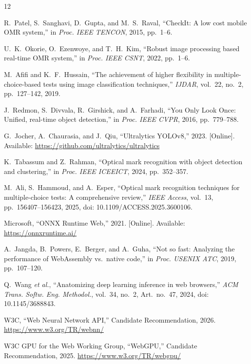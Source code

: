 \documentclass[conference]{IEEEtran}
\begin{document}
\begin{thebibliography}{12}
\setlength{\itemsep}{0pt}\setlength{\parsep}{0pt}\scriptsize

R.~Patel, S.~Sanghavi, D.~Gupta, and M.~S.~Raval,
``CheckIt: A low cost mobile OMR system,''
in \textit{Proc. IEEE TENCON}, 2015, pp.~1--6.

U.~K.~Okorie, O.~Ezenwoye, and T.~H.~Kim,
``Robust image processing based real-time OMR system,''
in \textit{Proc. IEEE CSNT}, 2022, pp.~1--6.

M.~Afifi and K.~F.~Hussain,
``The achievement of higher flexibility in multiple-choice-based tests
using image classification techniques,''
\textit{IJDAR}, vol.~22, no.~2, pp.~127--142, 2019.

J.~Redmon, S.~Divvala, R.~Girshick, and A.~Farhadi,
``You Only Look Once: Unified, real-time object detection,''
in \textit{Proc. IEEE CVPR}, 2016, pp.~779--788.

G.~Jocher, A.~Chaurasia, and J.~Qiu,
``Ultralytics YOLOv8,'' 2023.
[Online]. Available: \url{https://github.com/ultralytics/ultralytics}

K.~Tabassum and Z.~Rahman,
``Optical mark recognition with object detection and clustering,''
in \textit{Proc. IEEE ICEEICT}, 2024, pp.~352--357.

M.~Ali, S.~Hammoud, and A.~Esper,
``Optical mark recognition techniques for multiple-choice tests:
A comprehensive review,''
\textit{IEEE Access}, vol.~13, pp.~156407--156423, 2025,
doi: 10.1109/ACCESS.2025.3600106.

Microsoft,
``ONNX Runtime Web,'' 2021.
[Online]. Available: \url{https://onnxruntime.ai/}

A.~Jangda, B.~Powers, E.~Berger, and A.~Guha,
``Not so fast: Analyzing the performance of WebAssembly vs.\ native
code,'' in \textit{Proc. USENIX ATC}, 2019, pp.~107--120.

Q.~Wang \textit{et al.},
``Anatomizing deep learning inference in web browsers,''
\textit{ACM Trans. Softw. Eng. Methodol.}, vol.~34, no.~2,
Art.~no.~47, 2024, doi: 10.1145/3688843.

W3C,
``Web Neural Network API,'' Candidate Recommendation, 2026.
\url{https://www.w3.org/TR/webnn/}

W3C GPU for the Web Working Group,
``WebGPU,'' Candidate Recommendation, 2025.
\url{https://www.w3.org/TR/webgpu/}

\end{thebibliography}
\end{document}
